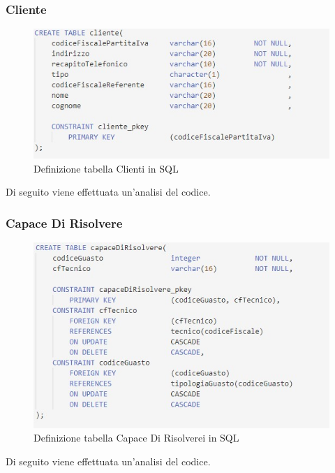 \documentclass[legalpaper]{article}
\begin{document}
	\subsubsection{Cliente}
		\begin{figure}[h]
			\centering
			\includegraphics[width=0.9\linewidth]{Immagini SQL/cliente}
			\caption{Definizione tabella Clienti in SQL}
			\label{clientesql}
		\end{figure}
		Di seguito viene effettuata un'analisi del codice. \\

	\subsubsection{Capace Di Risolvere}
		\begin{figure}[h]
			\centering
			\includegraphics[width=0.9\linewidth]{Immagini SQL/capaceDiRisolvere}
			\caption{Definizione tabella Capace Di Risolverei in SQL}
			\label{CapaceDiRisolveresql}
		\end{figure}
		Di seguito viene effettuata un'analisi del codice. \\
\end{document}
